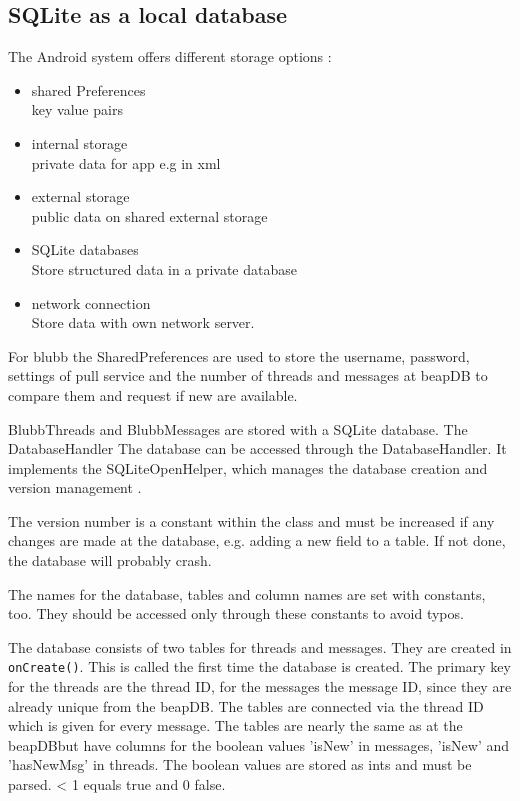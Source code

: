 \documentclass[12pt,a4paper,oneside]{report}
\newcommand{\appname}{blubb}
\newcommand{\beapDB}{beapDB}
\newcommand{\code}[1]{\lstinline{#1}}
\begin{document}
\subsection{SQLite as a local database}

The Android system offers different storage options \citep{aDefStorageOpt}:
\begin{itemize}
\item{shared Preferences \\key value pairs}
\item{internal storage \\private data for app e.g in xml}
\item{external storage \\public data on shared external storage}
\item{SQLite databases \\Store structured data in a private database}
\item{network connection \\Store data with own network server.}
\end{itemize}
 
For \appname{} the SharedPreferences are used to store the username, password, settings of pull service and the number of threads and messages at \beapDB{} to compare them and request if new are available.

BlubbThreads and BlubbMessages are stored with a SQLite database. 
The DatabaseHandler The database can be accessed through the DatabaseHandler. It implements the SQLiteOpenHelper, which manages the database creation and version management \citep{aDefSQLiteOpenHelper}.

The version number is a constant within the class and must be increased if any changes are made at the database, e.g. adding a new field to a table. If not done, the database will probably crash.


The names for the database, tables and column names are set with constants, too. They should be accessed only through these constants to avoid typos. 


The database consists of two tables for threads and messages.
They are created in \code{onCreate()}. This is called the first time the database is created. The primary key for the threads are the thread ID, for the messages the message ID, since they are already unique from the \beapDB{}. The tables are connected via the thread ID which is given for every message.
The tables are nearly the same as at the \beapDB but have columns for the boolean values 'isNew' in messages, 'isNew' and 'hasNewMsg' in threads. The boolean values are stored as ints and must be parsed. < 1 equals true and 0 false. 
\end{document}
